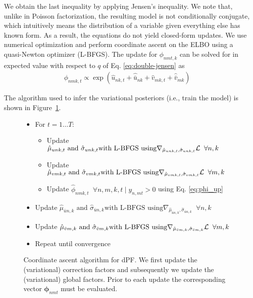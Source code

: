 \documentclass{sig-alternate}
\begin{document}
We obtain the last inequality by applying Jensen's inequality. We note that,
unlike in Poisson factorization, the resulting model is not conditionally
conjugate, which intuitively means the distribution of a variable given everything else 
has known form.
As a result, the equations do not yield closed-form updates.
We use numerical optimization and perform coordinate ascent on the ELBO
using a quasi-Newton optimizer (L-BFGS). The update for $\phi_{nmt,k}$ can
be solved for in expected value with respect to $q$ of Eq. \ref{eq:double-jensen} as
\begin{align}
\phi_{nmk,t} \propto \exp(\hat{u}_{nk,t} + \hat{\bar{u}}_{nk} +
\hat{v}_{mk,t} + \hat{\bar{v}}_{mk})
\label{eq:phi_up}
\end{align}

The algorithm used to infer the
variational posteriors (i.e., train the model) is shown in
Figure~\ref{fig:algo}. 



\begin{figure}
\begin{itemize}
\item[] For $t=1\ldots T:$
\begin{itemize}
\setlength{\itemindent}{-.2in}
  \item[] Update $\hat{\mu}_{unk,t} \text{ and } \hat{\sigma}_{unk,t} \text{with L-BFGS using} \nabla_{\hat{\mu}_{unk,t}, \hat{\sigma}_{unk,t}} {\cal L} \;\;\forall n,k$
  \item[] Update $\hat{\mu}_{vmk,t} \text{ and } \hat{\sigma}_{vmk,t} \text{with L-BFGS using} \nabla_{\hat{\mu}_{vmk,t}, \hat{\sigma}_{vmk,t}} {\cal L}  \;\;\forall m,k$
  \item[] Update $\hat{\phi}_{nmk,t} \;\;\forall n,m,k,t \mid y_{n,mt} > 0$ using Eq. \ref{eq:phi_up}
\end{itemize}
\item[] Update $\hat{\mu}_{\bar{u}n,k} \text{ and } \hat{\sigma}_{\bar{u}n,k}  \text{with L-BFGS using} \nabla_{\hat{\mu}_{\bar{u}n,k}, \hat{\sigma}_{\bar{u}n,k}}\;\;\forall n,k$
\item[] Update $\hat{\mu}_{\bar{v}m,k} \text{ and } \hat{\sigma}_{\bar{v}m,k}  \text{with L-BFGS using} \nabla_{\hat{\mu}_{\bar{v}m,k}, \hat{\sigma}_{\bar{v}m,k}} {\cal L} \;\; \forall m,k$
\item[] Repeat until convergence
\end{itemize}
\caption{Coordinate ascent algorithm for dPF. We first update the
(variational) correction factors and subsequently we update the (variational)
global factors. Prior to each update the corresponding vector
$\boldsymbol{\phi}_{nmt}$ must be evaluated.}
\label{fig:algo}
\end{figure}


 
\end{document}
